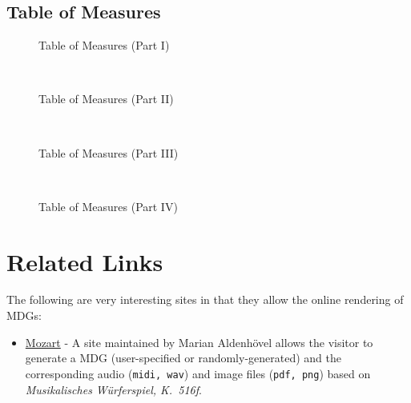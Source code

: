 \documentclass[letterpaper,x11names,svgnames,10pt]{article}
\begin{document}
{\nopagebreak[4]
\subsection{Table of Measures}

\begin{figure}[H]
	\centering
	\def\svgwidth{0.975\columnwidth}
	
	\caption{Table of Measures (Part I)}
	\label{fig:meas1}
\end{figure}

\newpage
${}_{}$\\
\vspace{0.10in}
\begin{figure}[H]
	\centering
	\def\svgwidth{0.975\columnwidth}
	
	\caption{Table of Measures (Part II)}
	\label{fig:meas2}
\end{figure}

\newpage
${}_{}$\\
\vspace{0.10in}
\begin{figure}[H]
	\centering
	\def\svgwidth{0.975\columnwidth}
	
	\caption{Table of Measures (Part III)}
	\label{fig:meas3}
\end{figure}

\newpage
${}_{}$\\
\vspace{0.10in}
\begin{figure}[H]
	\centering
	\def\svgwidth{0.975\columnwidth}
	
	\caption{Table of Measures (Part IV)}
	\label{fig:meas4}
\end{figure}


\newpage
\section{Related Links}
The following are very interesting sites in that they allow the online rendering of MDGs:
\begin{itemize}
	\item  \hyperref{https://marian-aldenhoevel.de/mozart/}{}{}{Mozart} - A site maintained by Marian Aldenh\"{o}vel allows the visitor to generate a MDG (user-specified or randomly-generated) and the corresponding audio ({\tt midi, wav}) and image files ({\tt pdf, png}) based on {\em Musikalisches W\"{u}rferspiel, K.\ 516f}.
	

\end{itemize}}
\end{document}

